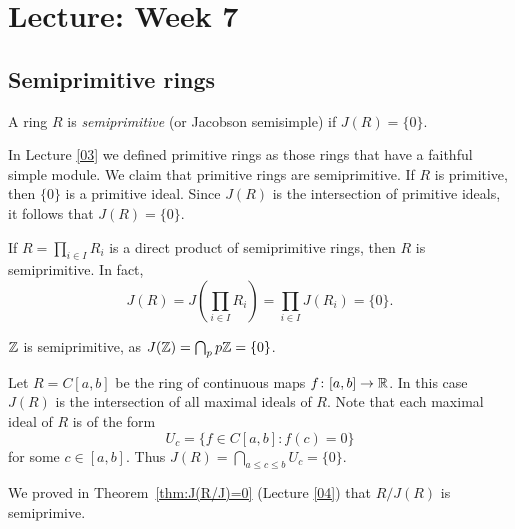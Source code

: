 \section{Lecture: Week 7}



\subsection{Semiprimitive rings}

\begin{definition}
	A ring $R$ is \emph{semiprimitive} (or Jacobson semisimple) if  $J(R)=\{0\}$.
\end{definition}

In Lecture \ref{03} we defined primitive rings as
those rings that have a faithful simple module.  We claim that primitive rings
are semiprimitive. If $R$ is primitive, then $\{0\}$ is a primitive ideal. Since
$J(R)$ is the intersection of primitive ideals, it follows that $J(R)=\{0\}$.

\begin{example}
	If $R=\prod_{i\in I}R_i$ is a direct product of semiprimitive rings, then
	$R$ is semiprimitive. In fact, 
	\[
		J(R)=J\left(\prod_{i\in I}R_i\right)=\prod_{i\in I}J(R_i)=\{0\}.
	\]
\end{example}

\begin{example}
$\mathbb{Z}$ is semiprimitive, as $J(\mathbb{Z})=\bigcap_{p}p\mathbb{Z}=\{0\}$.
\end{example}

\begin{example}
	\label{exa:C[a,b]}
	Let $R=C[a,b]$ be the ring of continuous maps $f\colon [a,b]\to\mathbb{R}$. 
	In this case $J(R)$ is the intersection of all maximal ideals of $R$. Note that 
	each maximal ideal of $R$ is of the form 
	\[
		U_c=\{f\in C[a,b]:f(c)=0\}
	\]
	for some $c\in[a,b]$. 
	Thus $J(R)=\bigcap_{a\leq c\leq
	b}U_c=\{0\}$.
\end{example}

We proved in Theorem~\ref{thm:J(R/J)=0} (Lecture \ref{04}) 
that $R/J(R)$ is semiprimive. 

%
%


